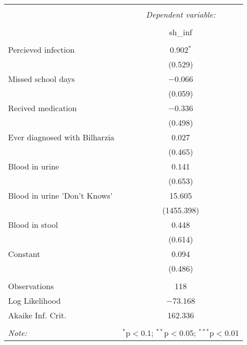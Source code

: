 
\begin{table}[!htbp] \centering 
  \caption{} 
  \label{} 
\begin{tabular}{@{\extracolsep{3pt}}lc} 
\\[-1.8ex]\hline 
\hline \\[-1.8ex] 
 & \multicolumn{1}{c}{\textit{Dependent variable:}} \\ 
\cline{2-2} 
\\[-1.8ex] & sh\_inf \\ 
\hline \\[-1.8ex] 
 Percieved infection & 0.902$^{*}$ \\ 
  & (0.529) \\ 
  Missed school days & $-$0.066 \\ 
  & (0.059) \\ 
  Recived medication & $-$0.336 \\ 
  & (0.498) \\ 
  Ever diagnosed with Bilharzia & 0.027 \\ 
  & (0.465) \\ 
  Blood in urine & 0.141 \\ 
  & (0.653) \\ 
  Blood in urine 'Don't Knows' & 15.605 \\ 
  & (1455.398) \\ 
  Blood in stool & 0.448 \\ 
  & (0.614) \\ 
  Constant & 0.094 \\ 
  & (0.486) \\ 
 \hline \\[-1.8ex] 
Observations & 118 \\ 
Log Likelihood & $-$73.168 \\ 
Akaike Inf. Crit. & 162.336 \\ 
\hline 
\hline \\[-1.8ex] 
\textit{Note:}  & \multicolumn{1}{r}{$^{*}$p$<$0.1; $^{**}$p$<$0.05; $^{***}$p$<$0.01} \\ 
\end{tabular} 
\end{table} 
